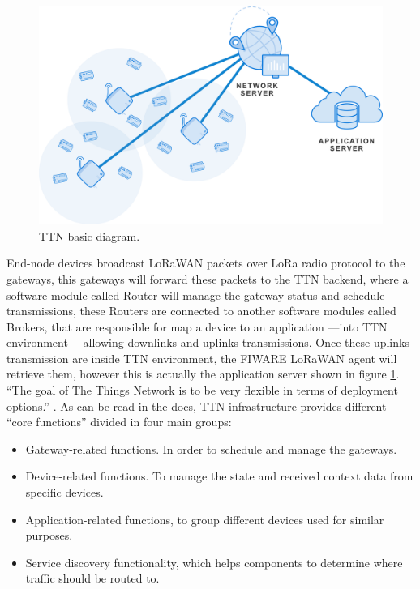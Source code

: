 \documentclass[11pt,a4paper,dvipsnames,twoside]{article}
\begin{document}
\begin{figure}[ht]
  \centering
  \includegraphics[width=.9\textwidth]{../pictures/TTN_overview.png}
  \caption{TTN basic diagram.}
  \label{fig:TTN_overview}
\end{figure}

End-node devices broadcast LoRaWAN packets over LoRa radio protocol to the gateways, this gateways will forward these packets to the TTN backend, where a software module called Router will manage the gateway status and schedule transmissions, these Routers are connected to another software modules called Brokers, that are responsible for map a device to an application ---into TTN environment--- allowing downlinks and uplinks transmissions. Once these uplinks transmission are inside TTN environment, the FIWARE LoRaWAN agent will retrieve them, however this is actually the application server shown in figure \ref{fig:TTN_overview}. \enquote{The goal of The Things Network is to be very flexible in terms of deployment options.} \cite{TTN_net_arch}. As can be read in the docs, TTN infrastructure provides different \enquote{core functions} divided in four main groups:

\begin{itemize}
  \item Gateway-related functions. In order to schedule and manage the gateways.
  \item Device-related functions. To manage the state and received context data from specific devices.
  \item Application-related functions, to group different devices used for similar purposes.
  \item Service discovery functionality, which helps components to determine where traffic should be routed to. 
\end{itemize}
\end{document}

